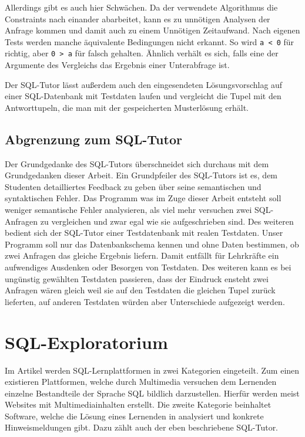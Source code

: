 Allerdings gibt es auch hier Schwächen. Da der verwendete Algorithmus die Constraints nach einander abarbeitet, kann es zu unnötigen Analysen der Anfrage kommen und damit auch zu einem Unnötigen Zeitaufwand. Nach eigenen Tests werden manche äquivalente Bedingungen nicht erkannt. So wird \verb|a < 0| für richtig, aber \verb|0 > a| für falsch gehalten. Ähnlich verhält es sich, falls eine der Argumente des Vergleichs das Ergebnis einer Unterabfrage ist.

Der SQL-Tutor lässt außerdem auch den eingesendeten Lösungsvorschlag auf einer SQL-Datenbank mit Testdaten laufen und vergleicht die Tupel mit den Antworttupeln, die man mit der gespeicherten Musterlösung erhält.

\subsection*{Abgrenzung zum SQL-Tutor}

Der Grundgedanke des SQL-Tutors überschneidet sich durchaus mit dem Grundgedanken dieser Arbeit. Ein Grundpfeiler des SQL-Tutors ist es, dem Studenten detailliertes Feedback zu geben über seine semantischen und syntaktischen Fehler. Das Programm was im Zuge dieser Arbeit entsteht soll weniger semantische Fehler analysieren, als viel mehr versuchen zwei SQL-Anfragen zu vergleichen und zwar egal wie sie aufgeschrieben sind. Des weiteren bedient sich der SQL-Tutor einer Testdatenbank mit realen Testdaten. Unser Programm soll nur das Datenbankschema kennen und ohne Daten bestimmen, ob zwei Anfragen das gleiche Ergebnis liefern. Damit entfällt für Lehrkräfte ein aufwendiges Ausdenken oder Besorgen von Testdaten. Des weiteren kann es bei ungünstig gewählten Testdaten passieren, dass der Eindruck ensteht zwei Anfragen wären gleich weil sie auf den Testdaten die gleichen Tupel zurück lieferten, auf anderen Testdaten würden aber Unterschiede aufgezeigt werden. 

\section{SQL-Exploratorium}

Im Artikel \cite{explora1} werden SQL-Lernplattformen in zwei Kategorien eingeteilt. Zum einen existieren Plattformen, welche durch Multimedia versuchen dem Lernenden einzelne Bestandteile der Sprache SQL bildlich darzustellen. Hierfür werden meist Websites mit Multimediainhalten erstellt. Die zweite Kategorie beinhaltet Software, welche die Lösung eines Lernenden in analysiert und konkrete Hinweismeldungen gibt. Dazu zählt auch der eben beschriebene SQL-Tutor.

